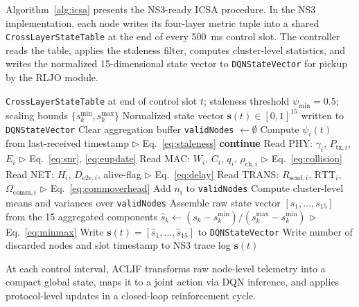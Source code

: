 \documentclass[a4paper]{cas-dc}
\numberwithin{equation}{section}
\begin{document}
Algorithm~\ref{alg:icsa} presents the NS3-ready ICSA procedure. In the NS3 implementation, each node writes its four-layer metric tuple into a shared \texttt{CrossLayerStateTable} at the end of every 500~ms control slot. The controller reads the table, applies the staleness filter, computes cluster-level statistics, and writes the normalized 15-dimensional state vector to \texttt{DQNStateVector} for pickup by the RLJO module.

\begin{algorithm}[!t]
\caption{ICSA Aggregate: Cross-Layer State Collection and Normalization}
\label{alg:icsa}
\begin{algorithmic}[1]\small
\Require \texttt{CrossLayerStateTable} at end of control slot $t$;\; staleness threshold $\psi_{\min}=0.5$;\; scaling bounds $\{s_k^{\min}, s_k^{\max}\}$
\Ensure Normalized state vector $\mathbf{s}(t) \in [0,1]^{15}$ written to \texttt{DQNStateVector}
\State Clear aggregation buffer \texttt{validNodes} $\leftarrow \emptyset$
    \State Compute $\psi_i(t)$ from last-received timestamp \hfill $\triangleright$ Eq.~\ref{eq:staleness}
     \textbf{continue} \EndIf
    \State Read PHY: $\gamma_i$, $P_{\text{tx},i}$, $E_i$ \hfill $\triangleright$ Eq.~\ref{eq:snr}, \ref{eq:eupdate}
    \State Read MAC: $W_i$, $C_i$, $q_i$, $\rho_{\text{ch},i}$ \hfill $\triangleright$ Eq.~\ref{eq:collision}
    \State Read NET: $H_i$, $D_{\text{e2e},i}$, alive-flag \hfill $\triangleright$ Eq.~\ref{eq:delay}
    \State Read TRANS: $R_{\text{send},i}$, $\mathrm{RTT}_i$, $\Omega_{\text{comm},i}$ \hfill $\triangleright$ Eq.~\ref{eq:commoverhead}
    \State Add $n_i$ to \texttt{validNodes}
\EndFor
\State Compute cluster-level means and variances over \texttt{validNodes}
\State Assemble raw state vector $[s_1,\ldots,s_{15}]$ from the 15 aggregated components
    \State $\hat{s}_k \leftarrow (s_k - s_k^{\min}) / (s_k^{\max} - s_k^{\min})$ \hfill $\triangleright$ Eq.~\ref{eq:minmax}
\EndFor
\State Write $\mathbf{s}(t) = [\hat{s}_1, \ldots, \hat{s}_{15}]$ to \texttt{DQNStateVector}
\State Write number of discarded nodes and slot timestamp to NS3 trace log
\State \Return $\mathbf{s}(t)$
\end{algorithmic}
\end{algorithm}

At each control interval, ACLIF transforms raw node-level telemetry into a compact global state, maps it to a joint action via DQN inference, and applies protocol-level updates in a closed-loop reinforcement cycle.
\end{document}
